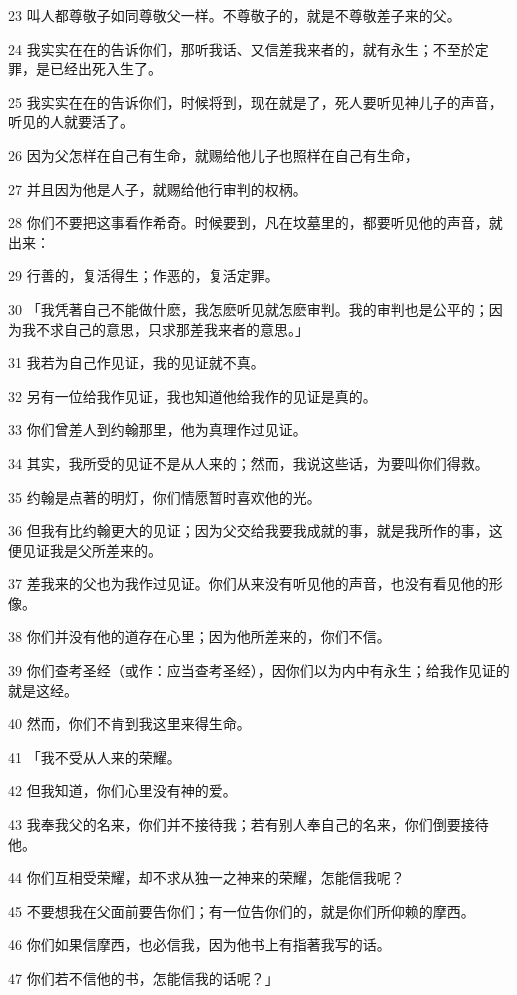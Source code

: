 \par 23 叫人都尊敬子如同尊敬父一样。不尊敬子的，就是不尊敬差子来的父。
\par 24 我实实在在的告诉你们，那听我话、又信差我来者的，就有永生；不至於定罪，是已经出死入生了。
\par 25 我实实在在的告诉你们，时候将到，现在就是了，死人要听见神儿子的声音，听见的人就要活了。
\par 26 因为父怎样在自己有生命，就赐给他儿子也照样在自己有生命，
\par 27 并且因为他是人子，就赐给他行审判的权柄。
\par 28 你们不要把这事看作希奇。时候要到，凡在坟墓里的，都要听见他的声音，就出来：
\par 29 行善的，复活得生；作恶的，复活定罪。
\par 30 「我凭著自己不能做什麽，我怎麽听见就怎麽审判。我的审判也是公平的；因为我不求自己的意思，只求那差我来者的意思。」
\par 31 我若为自己作见证，我的见证就不真。
\par 32 另有一位给我作见证，我也知道他给我作的见证是真的。
\par 33 你们曾差人到约翰那里，他为真理作过见证。
\par 34 其实，我所受的见证不是从人来的；然而，我说这些话，为要叫你们得救。
\par 35 约翰是点著的明灯，你们情愿暂时喜欢他的光。
\par 36 但我有比约翰更大的见证；因为父交给我要我成就的事，就是我所作的事，这便见证我是父所差来的。
\par 37 差我来的父也为我作过见证。你们从来没有听见他的声音，也没有看见他的形像。
\par 38 你们并没有他的道存在心里；因为他所差来的，你们不信。
\par 39 你们查考圣经（或作：应当查考圣经），因你们以为内中有永生；给我作见证的就是这经。
\par 40 然而，你们不肯到我这里来得生命。
\par 41 「我不受从人来的荣耀。
\par 42 但我知道，你们心里没有神的爱。
\par 43 我奉我父的名来，你们并不接待我；若有别人奉自己的名来，你们倒要接待他。
\par 44 你们互相受荣耀，却不求从独一之神来的荣耀，怎能信我呢？
\par 45 不要想我在父面前要告你们；有一位告你们的，就是你们所仰赖的摩西。
\par 46 你们如果信摩西，也必信我，因为他书上有指著我写的话。
\par 47 你们若不信他的书，怎能信我的话呢？」

